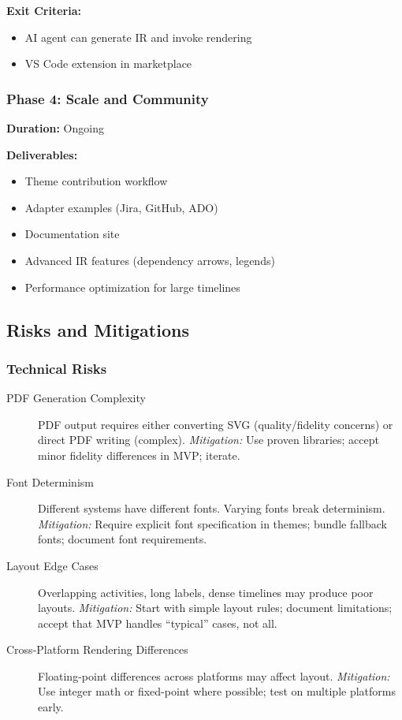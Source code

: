 \textbf{Exit Criteria:}
\begin{itemize}
  \item AI agent can generate IR and invoke rendering
  \item VS Code extension in marketplace
\end{itemize}

\subsubsection{Phase 4: Scale and Community}

\textbf{Duration:} Ongoing

\textbf{Deliverables:}
\begin{itemize}
  \item Theme contribution workflow
  \item Adapter examples (Jira, GitHub, ADO)
  \item Documentation site
  \item Advanced IR features (dependency arrows, legends)
  \item Performance optimization for large timelines
\end{itemize}

\subsection{Risks and Mitigations}

\subsubsection{Technical Risks}

\begin{description}
  \item[PDF Generation Complexity] PDF output requires either converting SVG (quality/fidelity concerns) or direct PDF writing (complex). \emph{Mitigation:} Use proven libraries; accept minor fidelity differences in MVP; iterate.
  
  \item[Font Determinism] Different systems have different fonts. Varying fonts break determinism. \emph{Mitigation:} Require explicit font specification in themes; bundle fallback fonts; document font requirements.
  
  \item[Layout Edge Cases] Overlapping activities, long labels, dense timelines may produce poor layouts. \emph{Mitigation:} Start with simple layout rules; document limitations; accept that MVP handles ``typical'' cases, not all.
  
  \item[Cross-Platform Rendering Differences] Floating-point differences across platforms may affect layout. \emph{Mitigation:} Use integer math or fixed-point where possible; test on multiple platforms early.
\end{description}


